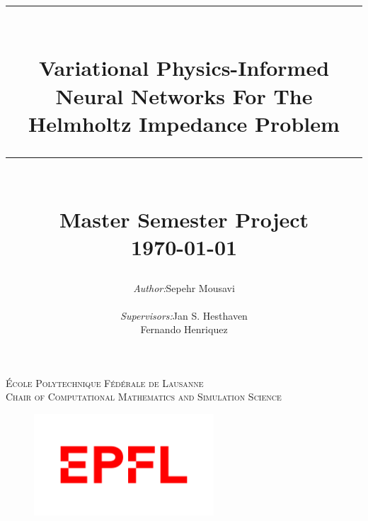 \documentclass[12pt, a4paper]{article}
\title{
	\rule{\linewidth}{0.5mm}\\
	\Large \textbf{{Variational Physics-Informed Neural Networks For The Helmholtz Impedance Problem}}
	\rule{\linewidth}{0.5mm}\\
	\normalsize {\textbf{Master Semester Project}}\\
	\normalsize \today\\[1.5cm]
}
\author{
	\begin{tabular}{lll}
		\textit{Author:} & Sepehr Mousavi\\
		& \\
		\textit{Supervisors:} & Jan S. Hesthaven\\
		\textit{} & Fernando Henriquez\\
	\end{tabular}
}
\begin{document}
	\begin{titlepage}
		\center

		\makeatletter
		\def\printauthor{{\centering \large \@author}}
		\makeatother

		\makeatletter
		\def\printtitle{{\centering \@title\par}}
		\makeatother

		\textsc{
			\large École Polytechnique Fédérale de Lausanne\\
			\large Chair of Computational Mathematics and Simulation Science
		}\\[1cm]
		\vspace{3cm}
		\printtitle
		\vspace{2cm}
		\printauthor
		\vfill
		\begin{figure}[h]
			\centering
			\includegraphics[width = 0.6\textwidth]{img/logo.png}
		\end{figure}

	\end{titlepage}

	\tableofcontents
	\thispagestyle{plain}
	\newpage

	\begin{abstract}
		
	\end{abstract}

	
	\newpage
	
	\newpage
	\appendix
	
\end{document}
